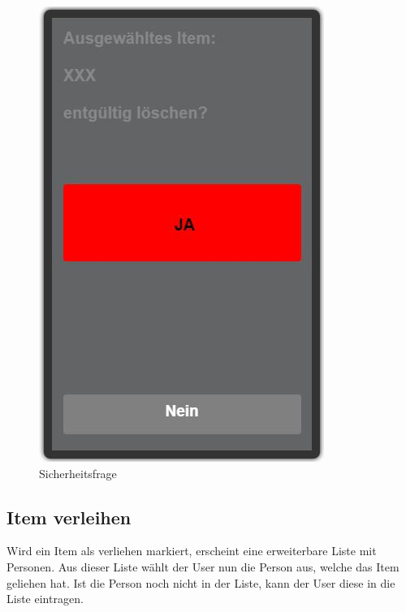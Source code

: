 \begin{figure}[htbp]
	\centering
	\includegraphics[scale=0.5]{pic/GUI/DeleteItem}
	\caption{Sicherheitsfrage}
	\end{figure}
	
\subsection{Item verleihen}

Wird ein Item als verliehen markiert, erscheint eine erweiterbare Liste mit Personen. Aus dieser Liste wählt der User nun die Person aus, welche das Item geliehen hat. Ist die Person noch nicht in der Liste, kann der User diese in die Liste eintragen.

